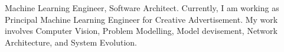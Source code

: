 \par{
	Machine Learning Engineer, Software Architect. Currently, I am working as Principal Machine Learning Engineer for Creative Advertisement. My work involves Computer Vision, Problem Modelling, Model devisement, Network Architecture, and System Evolution.
}